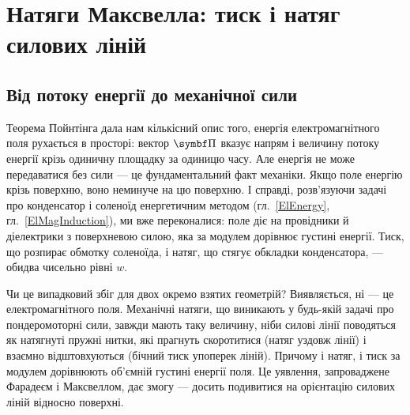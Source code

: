 \documentclass[]{ConspectBook}
\begin{document}

\section{Натяги Максвелла: тиск і натяг силових ліній}\label{sec:MaxwellStresses}

\subsection*{Від потоку енергії до механічної сили}

Теорема Пойнтінга дала нам кількісний опис того,  енергія електромагнітного поля рухається в просторі: вектор $\vect\Pi$ вказує
напрям і величину потоку енергії крізь одиничну площадку за одиницю часу. Але енергія не може передаватися без сили --- це фундаментальний
факт механіки. Якщо поле  енергію крізь поверхню, воно неминуче  на цю поверхню. І справді,
розв'язуючи задачі про конденсатор і соленоїд енергетичним методом (гл.~\ref{ElEnergy}, гл.~\ref{ElMagInduction}), ми вже переконалися: поле
діє на провідники й діелектрики з поверхневою силою, яка за модулем дорівнює густині енергії. Тиск, що розпирає обмотку соленоїда, і натяг,
що стягує обкладки конденсатора, --- обидва чисельно рівні $w$.

Чи це випадковий збіг для двох окремо взятих геометрій? Виявляється, ні --- це  електромагнітного поля.
Механічні натяги, що виникають у будь-якій задачі про пондеромоторні сили, завжди мають таку величину, ніби силові лінії поводяться як
натягнуті пружні нитки, які прагнуть скоротитися (натяг уздовж лінії) і взаємно відштовхуються (бічний тиск упоперек ліній). Причому і натяг,
і тиск за модулем дорівнюють об'ємній густині енергії поля. Це уявлення, запроваджене Фарадеєм і Максвеллом, дає змогу  --- досить подивитися на орієнтацію силових ліній відносно поверхні.
\end{document}
